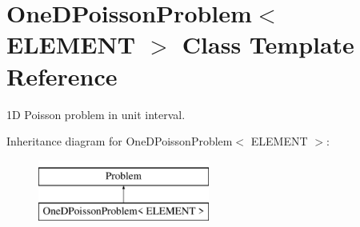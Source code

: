 \hypertarget{classOneDPoissonProblem}{}\section{One\+D\+Poisson\+Problem$<$ E\+L\+E\+M\+E\+NT $>$ Class Template Reference}
\label{classOneDPoissonProblem}


1D Poisson problem in unit interval.  


Inheritance diagram for One\+D\+Poisson\+Problem$<$ E\+L\+E\+M\+E\+NT $>$\+:\begin{figure}[H]
\begin{center}
\leavevmode
\includegraphics[height=2.000000cm]{classOneDPoissonProblem}
\end{center}
\end{figure}
